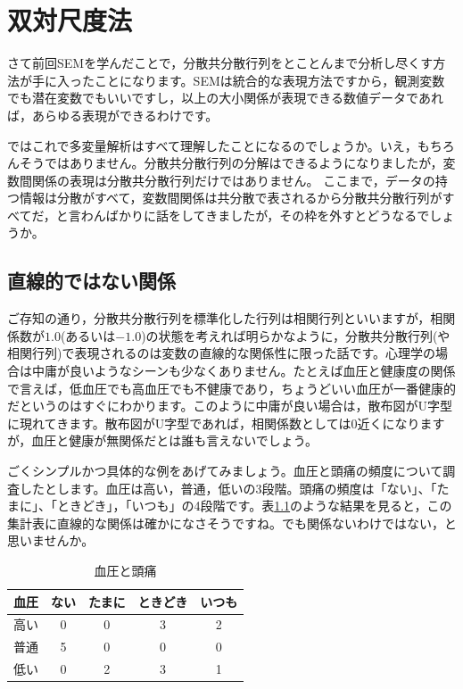 \documentclass{ltjsbook}
\begin{document}
\chapter{双対尺度法}
\label{x14_DualScaling}


さて前回SEMを学んだことで，分散共分散行列をとことんまで分析し尽くす方法が手に入ったことになります。SEMは統合的な表現方法ですから，観測変数でも潜在変数でもいいですし，以上の大小関係が表現できる数値データであれば，あらゆる表現ができるわけです。

ではこれで多変量解析はすべて理解したことになるのでしょうか。いえ，もちろんそうではありません。分散共分散行列の分解はできるようになりましたが，変数間関係の表現は分散共分散行列だけではありません。
ここまで，データの持つ情報は分散がすべて，変数間関係は共分散で表されるから分散共分散行列がすべてだ，と言わんばかりに話をしてきましたが，その枠を外すとどうなるでしょうか。

\section{直線的ではない関係}

ご存知の通り，分散共分散行列を標準化した行列は相関行列といいますが，相関係数が$1.0$(あるいは$-1.0$)の状態を考えれば明らかなように，分散共分散行列(や相関行列)で表現されるのは変数の直線的な関係性に限った話です。心理学の場合は中庸が良いようなシーンも少なくありません。たとえば血圧と健康度の関係で言えば，低血圧でも高血圧でも不健康であり，ちょうどいい血圧が一番健康的だというのはすぐにわかります。このように中庸が良い場合は，散布図がU字型に現れてきます。散布図がU字型であれば，相関係数としては0近くになりますが，血圧と健康が無関係だとは誰も言えないでしょう。

ごくシンプルかつ具体的な例をあげてみましょう。血圧と頭痛の頻度について調査したとします。血圧は高い，普通，低いの3段階。頭痛の頻度は「ない」、「たまに」、「ときどき」，「いつも」の4段階です。表\ref{tbl::14_01}のような結果を見ると，この集計表に直線的な関係は確かになさそうですね。でも関係ないわけではない，と思いませんか。
\begin{table}[ht]
	\begin{center}
		\caption{血圧と頭痛}
		\begin{tabular}{c|cccc}
			血圧 & ない & たまに & ときどき & いつも \\
			\hline
			高い & 0  & 0   & 3    & 2   \\
			普通 & 5  & 0   & 0    & 0   \\
			低い & 0  & 2   & 3    & 1   \\
		\end{tabular}
		\label{tbl::14_01}
	\end{center}
\end{table}
\end{document}
